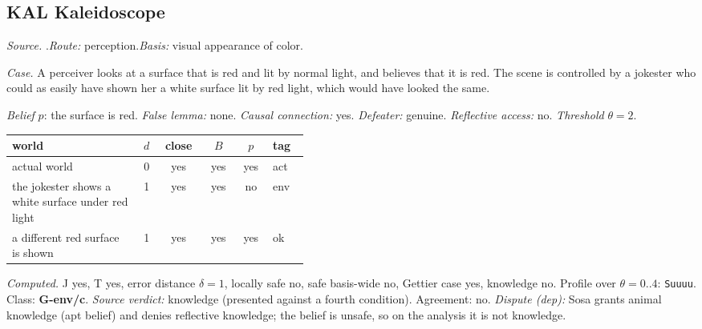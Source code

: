\subsection*{KAL \enspace Kaleidoscope}
\noindent\textit{Source.} \citet{Sosa2007}.\quad \textit{Route:} perception.\quad \textit{Basis:} visual appearance of color.\par
\noindent\textit{Case.} A perceiver looks at a surface that is red and lit by normal light, and believes that it is red. The scene is controlled by a jokester who could as easily have shown her a white surface lit by red light, which would have looked the same.\par
\noindent\textit{Belief} $p$: the surface is red.
 \textit{False lemma:} none. \textit{Causal connection:} yes. \textit{Defeater:} genuine. \textit{Reflective access:} no. \textit{Threshold} $\theta = 2$.\par
\begin{center}\begin{tabular}{@{}p{0.43\linewidth}rcccl@{}}
world & $d$ & close & $B$ & $p$ & tag \\ \midrule
actual world & 0 & yes & yes & yes & act \\
the jokester shows a white surface under red light & 1 & yes & yes & no & env \\
a different red surface is shown & 1 & yes & yes & yes & ok \\
\end{tabular}\end{center}
\noindent\textit{Computed.} J yes, T yes, error distance $\delta = 1$, locally safe no, safe basis-wide no, Gettier case yes, knowledge no. Profile over $\theta = 0..4$: \texttt{Suuuu}. Class: \textbf{G-env/c}.
 \textit{Source verdict:} knowledge (presented against a fourth condition). Agreement: no.
 \textit{Dispute (dep):} Sosa grants animal knowledge (apt belief) and denies reflective knowledge; the belief is unsafe, so on the analysis it is not knowledge.
\par\medskip
{}
